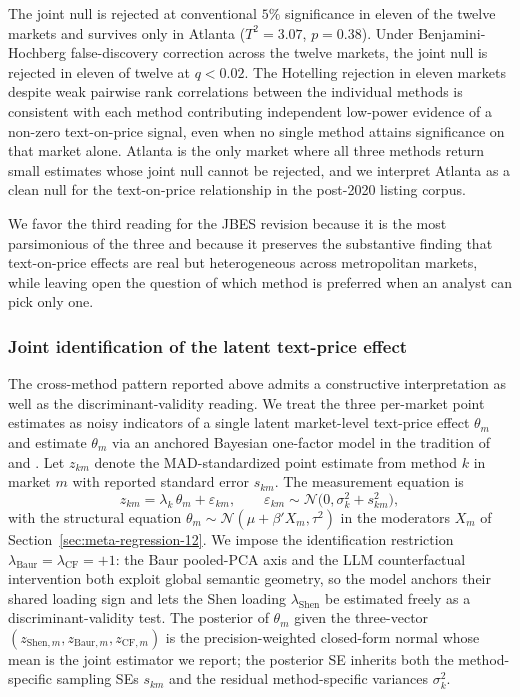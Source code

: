 The joint null is rejected at conventional $5\%$ significance in
eleven of the twelve markets and survives only in Atlanta
($T^2 = 3.07$, $p = 0.38$). Under Benjamini-Hochberg false-discovery
correction across the twelve markets, the joint null is rejected in
eleven of twelve at $q < 0.02$. The Hotelling rejection in eleven
markets despite weak pairwise rank correlations between the
individual methods is consistent with each method contributing
independent low-power evidence of a non-zero text-on-price signal,
even when no single method attains significance on that market alone.
Atlanta is the only market where all three methods return small
estimates whose joint null cannot be rejected, and we interpret
Atlanta as a clean null for the text-on-price relationship in the
post-2020 listing corpus.

We favor the third reading for the JBES revision because it is the
most parsimonious of the three and because it preserves the
substantive finding that text-on-price effects are real but
heterogeneous across metropolitan markets, while leaving open the
question of which method is preferred when an analyst can pick only
one.

\subsubsection{Joint identification of the latent text-price effect}
\label{sec:joint-identification}

The cross-method pattern reported above admits a constructive
interpretation as well as the discriminant-validity reading.  We
treat the three per-market point estimates as noisy indicators of a
single latent market-level text-price effect $\theta_m$ and estimate
$\theta_m$ via an anchored Bayesian one-factor model in the tradition
of \citet{joreskog1969general} and \citet{bartholomew2011latent}.
Let $z_{km}$ denote the MAD-standardized point estimate from method
$k$ in market $m$ with reported standard error $s_{km}$. The
measurement equation is
\begin{equation}
z_{km} = \lambda_k \, \theta_m + \varepsilon_{km}, \qquad
\varepsilon_{km} \sim \mathcal{N}\bigl(0, \sigma_k^2 + s_{km}^2\bigr),
\label{eq:cfa-measurement}
\end{equation}
with the structural equation
$\theta_m \sim \mathcal{N}(\mu + \beta' X_m, \tau^2)$ in the
moderators $X_m$ of Section~\ref{sec:meta-regression-12}.  We impose
the identification restriction
$\lambda_{\mathrm{Baur}} = \lambda_{\mathrm{CF}} = +1$: the Baur
pooled-PCA axis and the LLM counterfactual intervention both exploit
global semantic geometry, so the model anchors their shared loading
sign and lets the Shen loading $\lambda_{\mathrm{Shen}}$ be
estimated freely as a discriminant-validity test.  The posterior of
$\theta_m$ given the three-vector
$(z_{\mathrm{Shen},m}, z_{\mathrm{Baur},m}, z_{\mathrm{CF},m})$ is
the precision-weighted closed-form normal whose mean is the joint
estimator we report; the posterior SE inherits both the
method-specific sampling SEs $s_{km}$ and the residual
method-specific variances $\sigma_k^2$.

